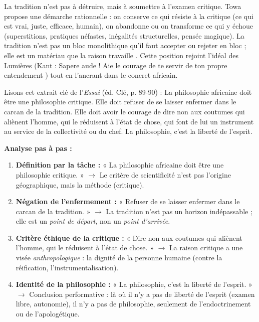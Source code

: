 \documentclass[11pt]{article}
\newcommand{\cle}[1]{{\popxbold\color{popdark}#1}}
\begin{document}
\begin{propriete}
La tradition n'est pas à détruire, mais à \cle{soumettre à l'examen critique}. Towa propose une démarche rationnelle : on conserve ce qui résiste à la critique (ce qui est vrai, juste, efficace, humain), on abandonne ou on transforme ce qui y échoue (superstitions, pratiques néfastes, inégalités structurelles, pensée magique). \guillemotleft La tradition n'est pas un bloc monolithique qu'il faut accepter ou rejeter en bloc ; elle est un matériau que la raison travaille \guillemotright. Cette position rejoint l'idéal des Lumières (Kant : \guillemotleft Sapere aude ! Aie le courage de te servir de ton propre entendement \guillemotright) tout en l'ancrant dans le concret africain.
\end{propriete}

\begin{experience}
Lisons cet extrait clé de l'\emph{Essai} (éd. Clé, p. 89-90) :
\guillemotleft La philosophie africaine doit être une philosophie critique. Elle doit refuser de se laisser enfermer dans le carcan de la tradition. Elle doit avoir le courage de dire non aux coutumes qui aliènent l'homme, qui le réduisent à l'état de chose, qui font de lui un instrument au service de la collectivité ou du chef. La philosophie, c'est la liberté de l'esprit. \guillemotright

\noindent\textbf{Analyse pas à pas :}
\begin{enumerate}
\item \textbf{Définition par la tâche :} « La philosophie africaine doit être une philosophie critique. » $\rightarrow$ Le critère de scientificité n'est pas l'origine géographique, mais la méthode (critique).
\item \textbf{Négation de l'enfermement :} « Refuser de se laisser enfermer dans le carcan de la tradition. » $\rightarrow$ La tradition n'est pas un horizon indépassable ; elle est un \emph{point de départ}, non un \emph{point d'arrivée}.
\item \textbf{Critère éthique de la critique :} « Dire non aux coutumes qui aliènent l'homme, qui le réduisent à l'état de chose. » $\rightarrow$ La raison critique a une visée \emph{anthropologique} : la dignité de la personne humaine (contre la réification, l'instrumentalisation).
\item \textbf{Identité de la philosophie :} « La philosophie, c'est la liberté de l'esprit. » $\rightarrow$ Conclusion performative : là où il n'y a pas de liberté de l'esprit (examen libre, autonomie), il n'y a pas de philosophie, seulement de l'endoctrinement ou de l'apologétique.
\end{enumerate}
\end{experience}
\end{document}
